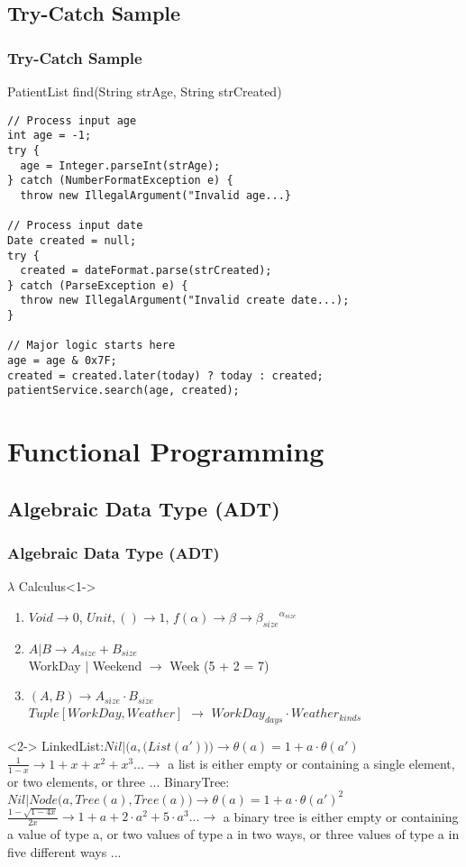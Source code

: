 \documentclass{beamer}
\begin{document}
\subsection{Try-Catch Sample}
\begin{frame}[fragile]
  \frametitle{Try-Catch Sample}
PatientList find(String strAge, String strCreated)
\scriptsize{
\begin{verbatim}
// Process input age
int age = -1;
try {
  age = Integer.parseInt(strAge);
} catch (NumberFormatException e) {
  throw new IllegalArgument("Invalid age...}

// Process input date
Date created = null;
try {
  created = dateFormat.parse(strCreated);
} catch (ParseException e) {
  throw new IllegalArgument("Invalid create date...);
}

// Major logic starts here
age = age & 0x7F;
created = created.later(today) ? today : created;
patientService.search(age, created);
\end{verbatim}
} 
\end{frame}

\section{Functional Programming}
\subsection{Algebraic Data Type (ADT)}
\begin{frame}
  \frametitle{Algebraic Data Type (ADT)}
  \begin{block}{$\lambda$ Calculus}<1->
    \begin{enumerate}
    \item $Void \rightarrow 0$, $Unit, () \rightarrow 1$, $f(\alpha) \rightarrow \beta \rightarrow {\beta_{size}}^{\alpha_{size}}$
    \item $A | B \rightarrow A_{size} + B_{size}$
    \\ WorkDay $|$ Weekend $\rightarrow$ Week (5 + 2 = 7)
    \item $(A, B) \rightarrow A_{size} \cdot B_{size}$
    \\ $Tuple\left [WorkDay, Weather\right]$ $\rightarrow$ $WorkDay_{days} \cdot Weather_{kinds}$
    \end{enumerate}
  \end{block}
  \begin{example}<2->
  \alert{LinkedList:}$Nil | \Big(a, \big(List({a}')\big)\Big) \rightarrow \theta(a) = 1 + a \cdot \theta({a}')$ 
  $\frac{1}{1-x} \rightarrow 1+x+x^2+x^3... \rightarrow$ a list is either empty or containing a single element, or two elements, or three ...
  \alert{BinaryTree:}$Nil | Node\big(a, Tree(a), Tree(a)\big) \rightarrow \theta(a) = 1 + a \cdot \theta({a}')^2$ 
  $\frac{1-\sqrt{1-4x}}{2x} \rightarrow 1+a+2\cdot a^2 + 5 \cdot a^3 ... \rightarrow$ a binary tree is either empty or containing a value of type a, or two values of type a in two ways, or three values of type a in five different ways ...
  \end{example} 
\end{frame}
\end{document}
